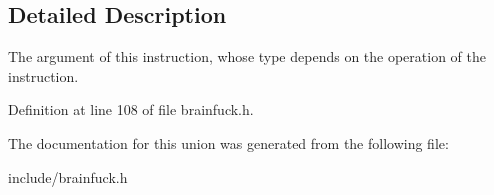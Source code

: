 \subsection{Detailed Description}
The argument of this instruction, whose type depends on the operation of the instruction. 

Definition at line 108 of file brainfuck.\+h.



The documentation for this union was generated from the following file\+:\begin{DoxyCompactItemize}
\item 
include/brainfuck.\+h\end{DoxyCompactItemize}
